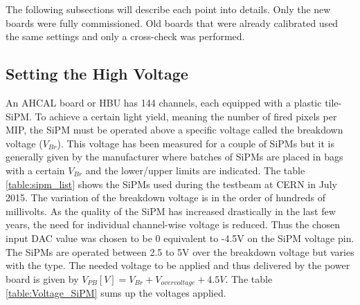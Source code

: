 The following subsections will describe each point into details. Only the new boards were fully commissioned. Old boards that were already calibrated used the same settings and only a cross-check was performed.

\subsection{Setting the High Voltage}

\begin{table}[htb!]
  \centering
  \caption{List of the different SiPMs used in the CALICE AHCAL in July 2015.}
  \label{table:sipm_list}
\end{table}

An AHCAL board or HBU has 144 channels, each equipped with a plastic tile-SiPM. To achieve a certain light yield, meaning the number of fired pixels per MIP, the SiPM must be operated above a specific voltage called the breakdown voltage ($V_{Br}$). This voltage has been measured for a couple of SiPMs but it is generally given by the manufacturer where batches of SiPMs are placed in bags with a certain $V_{Br}$ and the lower/upper limits are indicated. The table \ref{table:sipm_list} shows the SiPMs used during the testbeam at CERN in July 2015. The variation of the breakdown voltage is in the order of hundreds of millivolts. As the quality of the SiPM has increased drastically in the last few years, the need for individual channel-wise voltage is reduced. Thus the chosen input DAC value was chosen to be 0 equivalent to -4.5V on the SiPM voltage pin. The SiPMs are operated between 2.5 to 5V over the breakdown voltage but varies with the type. The needed voltage to be applied and thus delivered by the power board is given by $V_{PB} [V] = V_{Br} + V_{overvoltage} + 4.5V$. The table \ref{table:Voltage_SiPM} sums up the voltages applied.

